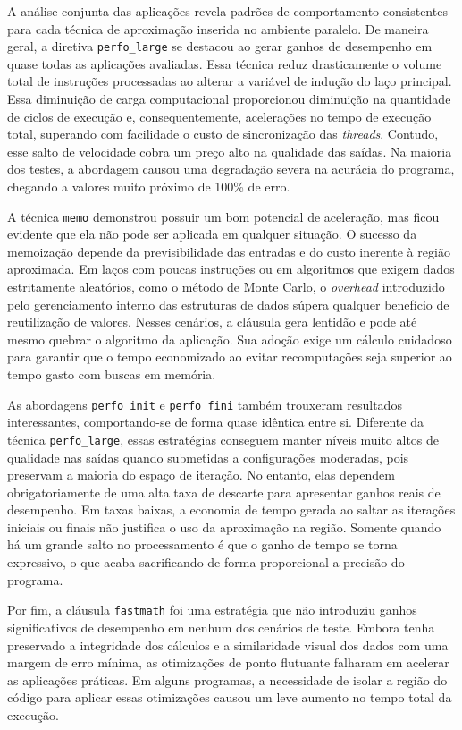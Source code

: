 A análise conjunta das aplicações revela padrões de comportamento consistentes para cada técnica de aproximação inserida no ambiente paralelo. De maneira geral, a diretiva \texttt{perfo\_large} se destacou ao gerar ganhos de desempenho em quase todas as aplicações avaliadas. Essa técnica reduz drasticamente o volume total de instruções processadas ao alterar a variável de indução do laço principal. Essa diminuição de carga computacional proporcionou diminuição na quantidade de ciclos de execução e, consequentemente, acelerações no tempo de execução total, superando com facilidade o custo de sincronização das \textit{threads}. Contudo, esse salto de velocidade cobra um preço alto na qualidade das saídas. Na maioria dos testes, a abordagem causou uma degradação severa na acurácia do programa, chegando a valores muito próximo de 100\% de erro.

A técnica \texttt{memo} demonstrou possuir um bom potencial de aceleração, mas ficou evidente que ela não pode ser aplicada em qualquer situação. O sucesso da memoização depende da previsibilidade das entradas e do custo inerente à região aproximada. Em laços com poucas instruções ou em algoritmos que exigem dados estritamente aleatórios, como o método de Monte Carlo, o \textit{overhead} introduzido pelo gerenciamento interno das estruturas de dados súpera qualquer benefício de reutilização de valores. Nesses cenários, a cláusula gera lentidão e pode até mesmo quebrar o algoritmo da aplicação. Sua adoção exige um cálculo cuidadoso para garantir que o tempo economizado ao evitar recomputações seja superior ao tempo gasto com buscas em memória.

As abordagens \texttt{perfo\_init} e \texttt{perfo\_fini} também trouxeram resultados interessantes, comportando-se de forma quase idêntica entre si. Diferente da técnica \texttt{perfo\_large}, essas estratégias conseguem manter níveis muito altos de qualidade nas saídas quando submetidas a configurações moderadas, pois preservam a maioria do espaço de iteração. No entanto, elas dependem obrigatoriamente de uma alta taxa de descarte para apresentar ganhos reais de desempenho. Em taxas baixas, a economia de tempo gerada ao saltar as iterações iniciais ou finais não justifica o uso da aproximação na região. Somente quando há um grande salto no processamento é que o ganho de tempo se torna expressivo, o que acaba sacrificando de forma proporcional a precisão do programa.

Por fim, a cláusula \texttt{fastmath} foi uma estratégia que não introduziu ganhos significativos de desempenho em nenhum dos cenários de teste. Embora tenha preservado a integridade dos cálculos e a similaridade visual dos dados com uma margem de erro mínima, as otimizações de ponto flutuante falharam em acelerar as aplicações práticas. Em alguns programas, a necessidade de isolar a região do código para aplicar essas otimizações causou um leve aumento no tempo total da execução.